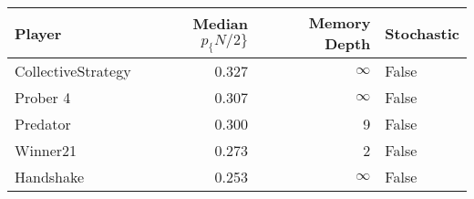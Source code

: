 \begin{tabular}{lrrl}
\toprule
             Player &  Median $p_\{N/2\}$ &  Memory Depth & Stochastic \\
\midrule
 CollectiveStrategy &             0.327 &            \(\infty\) &      False \\
           Prober 4 &             0.307 &            \(\infty\) &      False \\
           Predator &             0.300 &             9 &      False \\
           Winner21 &             0.273 &             2 &      False \\
          Handshake &             0.253 &            \(\infty\) &      False \\
\bottomrule
\end{tabular}
